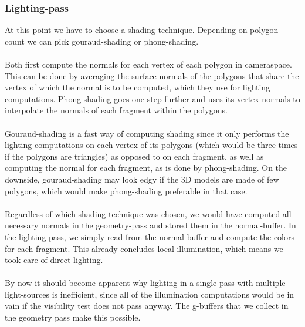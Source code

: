 \documentclass{ACGSeminar}
\begin{document}
	\subsubsection{Lighting-pass} \label{lpass}
		At this point we have to choose a shading technique. Depending on polygon-count we can pick gouraud-shading or phong-shading. \\\\
		Both first compute the normals for each vertex of each polygon in cameraspace. This can be done by averaging the surface normals of the polygons that share the vertex of which the normal is to be computed, which they use for lighting computations. Phong-shading goes one step further and uses its vertex-normals to interpolate the normals of each fragment within the polygons. \\\\
		Gouraud-shading is a fast way of computing shading since it only performs the lighting computations on each vertex of its polygons (which would be three times if the polygons are triangles) as opposed to on each fragment, as well as computing the normal for each fragment, as is done by phong-shading. On the downside, gouraud-shading may look edgy if the 3D models are made of few polygons, which would make phong-shading preferable in that case. \\\\
		Regardless of which shading-technique was chosen, we would have computed all necessary normals in the geometry-pass and stored them in the normal-buffer. In the lighting-pass, we simply read from the normal-buffer and compute the colors for each fragment. This already concludes local illumination, which means we took care of direct lighting.\\\\
		By now it should become apparent why lighting in a single pass with multiple light-sources is inefficient, since all of the illumination computations would be in vain if the visibility test does not pass anyway. The g-buffers that we collect in the geometry pass make this possible. 
\end{document}
